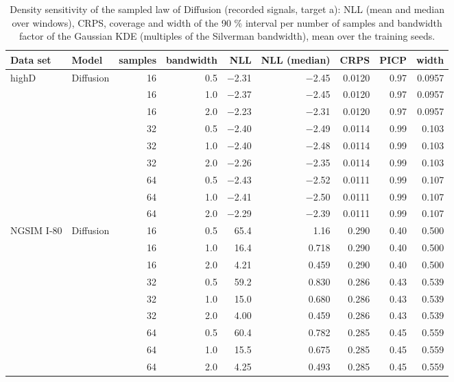 \begin{table}[htbp]
\centering
\footnotesize
\caption{Density sensitivity of the sampled law of Diffusion (recorded signals, target a): NLL (mean and median over windows), CRPS, coverage and width of the 90 \% interval per number of samples and bandwidth factor of the Gaussian KDE (multiples of the Silverman bandwidth), mean over the training seeds.}
\label{tab:t1-density-sensitivity--raw--a}
\begin{tabular}{llrrrrrrr}
\toprule
Data set & Model & samples & bandwidth & NLL & NLL (median) & CRPS & PICP & width \\
\midrule
highD & Diffusion & 16 & 0.5 & $-$2.31 & $-$2.45 & 0.0120 & 0.97 & 0.0957 \\
 &  & 16 & 1.0 & $-$2.37 & $-$2.45 & 0.0120 & 0.97 & 0.0957 \\
 &  & 16 & 2.0 & $-$2.23 & $-$2.31 & 0.0120 & 0.97 & 0.0957 \\
 &  & 32 & 0.5 & $-$2.40 & $-$2.49 & 0.0114 & 0.99 & 0.103 \\
 &  & 32 & 1.0 & $-$2.40 & $-$2.48 & 0.0114 & 0.99 & 0.103 \\
 &  & 32 & 2.0 & $-$2.26 & $-$2.35 & 0.0114 & 0.99 & 0.103 \\
 &  & 64 & 0.5 & $-$2.43 & $-$2.52 & 0.0111 & 0.99 & 0.107 \\
 &  & 64 & 1.0 & $-$2.41 & $-$2.50 & 0.0111 & 0.99 & 0.107 \\
 &  & 64 & 2.0 & $-$2.29 & $-$2.39 & 0.0111 & 0.99 & 0.107 \\
\midrule
NGSIM I-80 & Diffusion & 16 & 0.5 & 65.4 & 1.16 & 0.290 & 0.40 & 0.500 \\
 &  & 16 & 1.0 & 16.4 & 0.718 & 0.290 & 0.40 & 0.500 \\
 &  & 16 & 2.0 & 4.21 & 0.459 & 0.290 & 0.40 & 0.500 \\
 &  & 32 & 0.5 & 59.2 & 0.830 & 0.286 & 0.43 & 0.539 \\
 &  & 32 & 1.0 & 15.0 & 0.680 & 0.286 & 0.43 & 0.539 \\
 &  & 32 & 2.0 & 4.00 & 0.459 & 0.286 & 0.43 & 0.539 \\
 &  & 64 & 0.5 & 60.4 & 0.782 & 0.285 & 0.45 & 0.559 \\
 &  & 64 & 1.0 & 15.5 & 0.675 & 0.285 & 0.45 & 0.559 \\
 &  & 64 & 2.0 & 4.25 & 0.493 & 0.285 & 0.45 & 0.559 \\
\bottomrule
\end{tabular}
\end{table}
